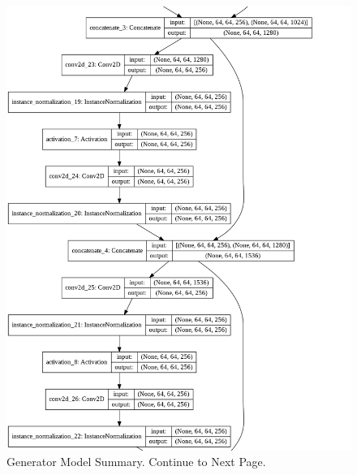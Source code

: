 \begin{figure}[H]
        \vspace*{3cm}
	    \begin{center} 
	    \includegraphics[scale=0.40]{images/Appendix/generator_4.png}
	    \caption{Generator Model Summary. Continue to Next Page.}
	    \end{center}
\end{figure}


